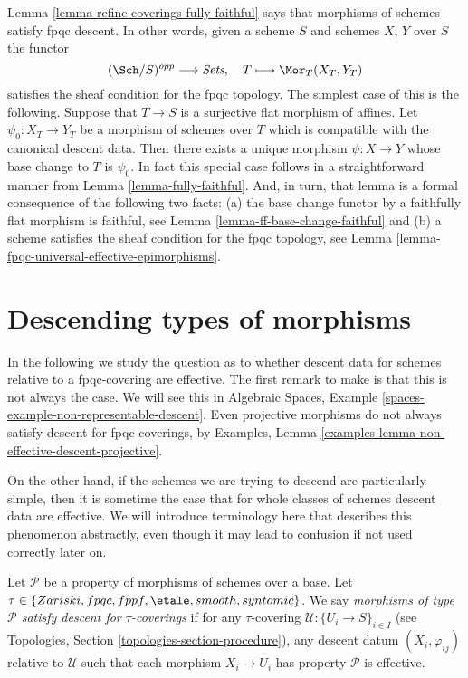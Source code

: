 \begin{remark}
\label{remark-morphisms-of-schemes-satisfy-fpqc-descent}
Lemma \ref{lemma-refine-coverings-fully-faithful}
says that morphisms of schemes satisfy fpqc descent.
In other words, given a scheme $S$ and schemes $X$, $Y$ over $S$
the functor
$$
(\Sch/S)^{opp} \longrightarrow \textit{Sets},
\quad
T \longmapsto \Mor_T(X_T, Y_T)
$$
satisfies the sheaf condition for the fpqc topology.
The simplest case of this is the following. Suppose that $T \to S$
is a surjective flat morphism of affines. Let $\psi_0 : X_T \to Y_T$
be a morphism of schemes over $T$ which is compatible with the
canonical descent data. Then there exists a unique morphism
$\psi : X \to Y$ whose base change to $T$ is $\psi_0$. In fact this
special case follows in a straightforward manner from
Lemma \ref{lemma-fully-faithful}.
And, in turn, that lemma is a formal consequence of the following
two facts:
(a) the base change functor by a faithfully flat morphism is faithful, see
Lemma \ref{lemma-ff-base-change-faithful}
and (b) a scheme satisfies the sheaf condition for the fpqc topology, see
Lemma \ref{lemma-fpqc-universal-effective-epimorphisms}.
\end{remark}







\section{Descending types of morphisms}
\label{section-descending-types-morphisms}

\noindent
In the following we study the question as to whether
descent data for schemes relative to a fpqc-covering
are effective. The first remark to make is that this
is not always the case. We will see this in Algebraic
Spaces, Example \ref{spaces-example-non-representable-descent}.
Even projective morphisms do not always satisfy descent
for fpqc-coverings, by Examples,
Lemma \ref{examples-lemma-non-effective-descent-projective}.

\medskip\noindent
On the other hand, if the schemes we are trying to
descend are particularly simple, then it is sometime the
case that for whole classes of schemes descent data
are effective. We will introduce terminology here that
describes this phenomenon abstractly, even though it
may lead to confusion if not used correctly later on.

\begin{definition}
\label{definition-descending-types-morphisms}
Let $\mathcal{P}$ be a property of morphisms of schemes over a base.
Let $\tau \in \{Zariski, fpqc, fppf, \etale, smooth, syntomic\}$.
We say
{\it morphisms of type $\mathcal{P}$ satisfy descent for $\tau$-coverings}
if for
any $\tau$-covering $\mathcal{U} : \{U_i \to S\}_{i \in I}$
(see Topologies, Section \ref{topologies-section-procedure}),
any descent datum $(X_i, \varphi_{ij})$ relative to $\mathcal{U}$
such that each morphism $X_i \to U_i$ has property $\mathcal{P}$
is effective.
\end{definition}

